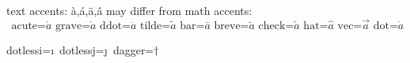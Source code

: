 \documentclass[11pt]{article}
\begin{document}
text accents: \`{a},\'{a},\"{a},\^{a}
may differ from math accents:
\begin{displaymath}
\mbox{ acute=}\acute{a}
\mbox{ grave=}\grave{a}
\mbox{ ddot=}\ddot {a}
\mbox{ tilde=}\tilde{a}
\mbox{ bar=}\bar  {a}
\mbox{ breve=}\breve{a}
\mbox{ check=}\check{a}
\mbox{ hat=}\hat  {a}
\mbox{ vec=}\vec  {a}
\mbox{ dot=}\dot  {a}
\end{displaymath}

dotlessi=\i\ 
dotlessj=\j\ 
dagger=$\dagger$\ \ \ 

\end{document}
